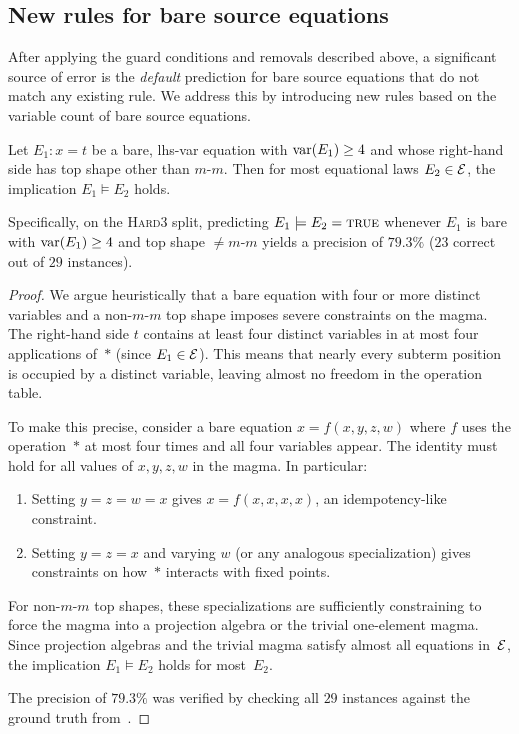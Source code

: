 \subsection{New rules for bare source equations}\label{subsec:bare-rules}

After applying the guard conditions and removals described above,
a significant source of error is the \emph{default} prediction for
bare source equations that do not match any existing rule.  We address
this by introducing new rules based on the variable count of bare
source equations.

\begin{proposition}\label{prop:bare-v4}
Let $E_1\colon x = t$ be a bare, lhs-var equation with
$\operatorname{var}(E_1) \geq 4$ and whose right-hand side has top shape other
than $m$-$m$.  Then for most equational laws $E_2 \in \mathcal{E}$,
the implication $E_1 \models E_2$ holds.

Specifically, on the \textsc{Hard3} split, predicting
$E_1 \models E_2 = \textsc{true}$ whenever $E_1$ is bare
with $\operatorname{var}(E_1) \geq 4$ and top shape $\neq m$-$m$ yields
a precision of $79.3\%$ ($23$ correct out of $29$ instances).
\end{proposition}

\begin{proof}
We argue heuristically that a bare equation with four or more
distinct variables and a non-$m$-$m$ top shape imposes severe
constraints on the magma.  The right-hand side $t$ contains at
least four distinct variables in at most four applications of~$*$
(since $E_1 \in \mathcal{E}$).  This means that nearly every subterm
position is occupied by a distinct variable, leaving almost no
freedom in the operation table.

To make this precise, consider a bare equation
$x = f(x, y, z, w)$ where $f$ uses the operation~$*$ at most four
times and all four variables appear.  The identity must hold for
all values of $x, y, z, w$ in the magma.  In particular:
\begin{enumerate}[label=(\alph*)]
\item Setting $y = z = w = x$ gives $x = f(x, x, x, x)$, an
  idempotency-like constraint.
\item Setting $y = z = x$ and varying $w$ (or any analogous
  specialization) gives constraints on how~$*$ interacts with
  fixed points.
\end{enumerate}
For non-$m$-$m$ top shapes, these specializations are sufficiently
constraining to force the magma into a projection algebra or the
trivial one-element magma.  Since projection algebras and the trivial
magma satisfy almost all equations in~$\mathcal{E}$, the implication
$E_1 \models E_2$ holds for most~$E_2$.

The precision of $79.3\%$ was verified by checking all $29$ instances
against the ground truth from~\cite{bolan2025equational}.
\end{proof}

